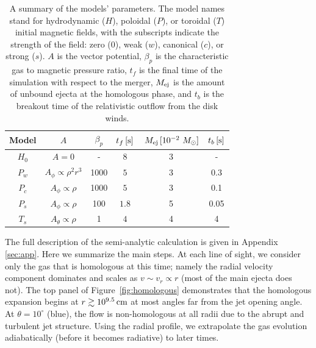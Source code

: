 \documentclass[twocolumn,dvipsnames]{aastex62}
\newcommand{\mej}{\,{M_{\rm ej}}}
\newcommand{\msun}{\,{M_{\odot}}}
\begin{document}
	\begin{table}
		\setlength{\tabcolsep}{6.2pt}
		\centering
		\renewcommand{\arraystretch}{1.2}
		\begin{tabular}{| c | c c c | c c | }
			
                \hline
			Model & $ A $ & $ \beta_p $ & $ t_f\,[{\rm s}] $ & $ \mej\,[10^{-2}\,\msun] $ & $ t_b\,[{\rm s}] $
			\\	\hline
			$ H_0 $ & $ A = 0 $ & - & $ 8 $ & 3 & - \\ %
			$ P_w $ & $ A_\phi \propto \rho^2r^3 $ & 1000 & $ 5 $ & 3 & 0.3\\ %
			$ P_c $ & $ A_\phi \propto \rho $ & 1000 & $ 5 $ & 3 & 0.1 \\   %
			$ P_s $ & $ A_\phi \propto \rho $ & 100 & $ 1.8 $ & 5 & 0.05\\   %
			$ T_s $ & $ A_\theta \propto \rho $ & 1 & $ 4 $ & 4 & 4 \\ %
                \hline
		\end{tabular}
		
		\caption{
			A summary of the models' parameters. The model names stand for hydrodynamic ($H$), poloidal ($P$), or toroidal ($T$) initial magnetic fields, with the subscripts indicate the strength of the field: zero ($0$), weak ($w$), canonical ($c$), or strong ($s$). $ A $ is the vector potential, $ \beta_p $ is the characteristic gas to magnetic pressure ratio, $ t_f $ is the final time of the simulation with respect to the merger, $ M_{\rm ej} $ is the amount of unbound ejecta at the homologous phase, and $ t_b $ is the breakout time of the relativistic outflow from the disk winds.
    		}
    		\label{tab:models}
	\end{table}

The full description of the semi-analytic calculation is given in Appendix \ref{sec:app}. Here we summarize the main steps. At each line of sight, we consider only the gas that is homologous at this time; namely the radial velocity component dominates and scales as $ v \sim v_r \propto r $ (most of the main ejecta does not). The top panel of Figure~\ref{fig:homologous} demonstrates that the homologous expansion begins at $ r \gtrsim 10^{9.5}\,{\rm cm} $ at most angles far from the jet opening angle. At $ \theta = 10^\circ $ (blue), the flow is non-homologous at all radii due to the abrupt and turbulent jet structure. Using the radial profile, we extrapolate the gas evolution adiabatically (before it becomes radiative) to later times.
\end{document}
